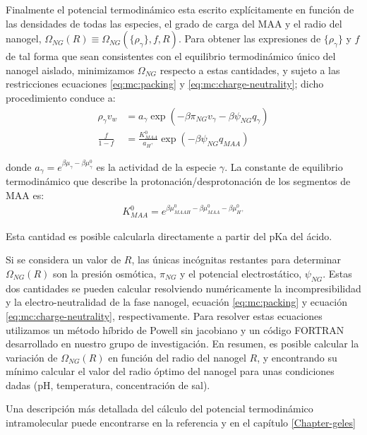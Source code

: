 	
	Finalmente el potencial termodin\'amico esta escrito expl\'icitamente en funci\'on de las densidades de todas las especies, el grado de carga del MAA y el radio del nanogel, $\Omega_{NG}(R)\equiv\Omega_{NG}(\{\rho_\gamma\},f,R)$.
	Para obtener las expresiones de $\{\rho_\gamma\}$ y $f$ de tal forma que sean consistentes con el equilibrio termodin\'amico \'unico del nanogel aislado, minimizamos $\Omega_{NG}$ respecto a estas cantidades, y  sujeto a las restricciones ecuaciones  \ref{eq:mc:packing} y  \ref{eq:mc:charge-neutrality}; dicho procedimiento conduce a: 
	\begin{align}
		\rho_\gamma v_w &= a_\gamma \exp(-\beta\pi_{NG}v_\gamma -\beta\psi_{NG}q_{\gamma})\\
		\frac{f}{1-f}&= \frac{K^0_{MAA}}{a_{H^+}}\exp(-\beta\psi_{NG}q_{MAA})\label{eq:mc:fcharge}
	\end{align}
	
	\noindent donde $a_\gamma = e^{\beta\mu_\gamma-\beta\mu_\gamma^0}$ es la actividad de la especie $\gamma$. 
	La constante de equilibrio termodin\'amico que describe la protonaci\'on/desprotonaci\'on de los segmentos de MAA es:
	\begin{align}
		K^0_{MAA}= e^{\beta\mu^0_{MAAH}-\beta\mu^0_{MAA}-\beta\mu^0_{H^+}}
	\end{align}
	
	\noindent Esta cantidad es posible calcularla directamente a partir del pKa del \'acido.
	
	
	Si se considera  un valor de  $R$, las \'unicas inc\'ognitas restantes para determinar $\Omega_{NG}(R)$ son la presi\'on osm\'otica, $\pi_{NG}$ y el potencial electrost\'atico, $\psi_{NG}$.
	Estas dos cantidades se pueden calcular resolviendo num\'ericamente la incompresibilidad y la electro-neutralidad de la fase nanogel, ecuaci\'on \ref{eq:mc:packing} y ecuaci\'on \ref{eq:mc:charge-neutrality}, respectivamente.
	Para resolver estas ecuaciones utilizamos un m\'etodo h\'ibrido de Powell sin jacobiano y un c\'odigo FORTRAN desarrollado en nuestro grupo de investigaci\'on.
	En resumen, es posible calcular la variaci\'on de  $\Omega_{NG}(R)$ en funci\'on del radio del nanogel $R$, y encontrando su m\'inimo calcular el valor del radio \'optimo del nanogel para unas condiciones dadas (pH, temperatura, concentraci\'on de sal).
	
	Una descripci\'on m\'as detallada del c\'alculo del potencial termodin\'amico intramolecular puede encontrarse en la referencia  \cite{perez2021thermodynamic} y en el cap\'itulo \ref{Chapter-geles}
	
